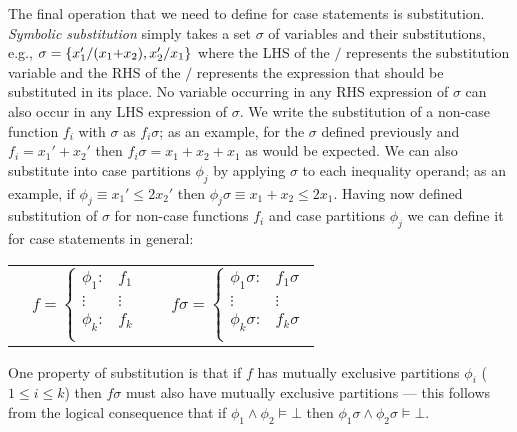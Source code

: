 The final operation that we need to define for case statements is
substitution.  \emph{Symbolic substitution} simply takes a set
$\sigma$ of variables and their substitutions, e.g., $\sigma = \{ x_1'
/ (x_1 \hspace{-.8mm} + \hspace{-.8mm} x_2), x_2' / x_1 \}$ where the
LHS of the $/$ represents the substitution variable and the RHS of the
$/$ represents the expression that should be substituted in its place.
No variable occurring in any RHS expression of $\sigma$ can also occur
in any LHS expression of $\sigma$.  We write the substitution of a
non-case function $f_i$ with $\sigma$ as $f_i\sigma$; as an example,
for the $\sigma$ defined previously and $f_i = x_1' + x_2'$ then
$f_i\sigma = x_1 + x_2 + x_1$ as would be expected.  We can also
substitute into case partitions $\phi_j$ by applying $\sigma$ to each
inequality operand; as an example, if $\phi_j \equiv x_1' \leq 2x_2'$ 
then $\phi_j \sigma \equiv x_1 + x_2 \leq 2x_1$.  
Having now defined substitution of $\sigma$ for non-case
functions $f_i$ and case partitions $\phi_j$ we can define it for case
statements in general:

{\footnotesize
\begin{center}
\begin{tabular}{r c c l}
&
\hspace{-6mm} 
  $f = \begin{cases}
    \phi_1: & f_1 \\ 
   \vdots&\vdots\\ 
    \phi_k: & f_k \\ 
  \end{cases}$
&

&
\hspace{-2mm}
  $f\sigma = \begin{cases}
    \phi_1\sigma: & f_1\sigma \\ 
   \vdots&\vdots\\ 
    \phi_k\sigma: & f_k\sigma \\ 
  \end{cases}$
\end{tabular}
\end{center}
}
\normalsize

One property of substitution is that
if $f$ has mutually exclusive partitions $\phi_i$ ($1 \leq i \leq k$)
then $f\sigma$ must also have mutually exclusive partitions ---
this follows from the logical consequence that 
if $\phi_1 \land \phi_2 \models \bot$
then $\phi_1\sigma \land \phi_2\sigma \models \bot$.

